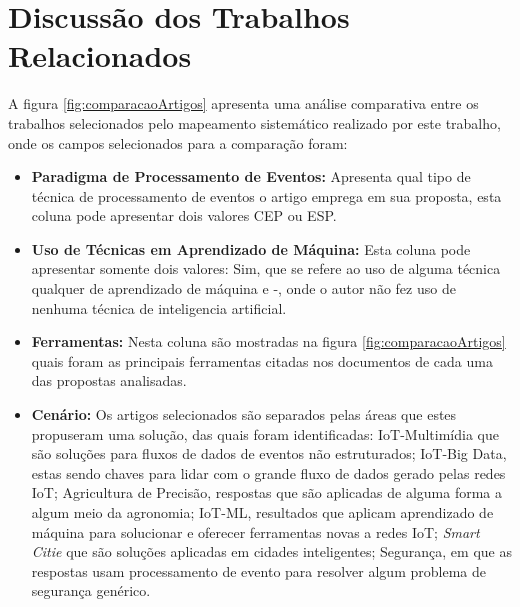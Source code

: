 \documentclass[ti,table]{texufpel} %
\begin{document}
  

  

\section{Discussão dos Trabalhos Relacionados} 

A figura \ref{fig:comparacaoArtigos} apresenta uma análise comparativa entre os trabalhos selecionados pelo mapeamento sistemático realizado por este trabalho, onde os campos selecionados para a comparação foram:  

  

\begin{itemize} 

     

    \item \textbf{Paradigma de Processamento de Eventos:} Apresenta qual tipo de técnica de processamento de eventos o artigo emprega em sua proposta, esta coluna pode apresentar dois valores CEP ou ESP.  

         

     

    \item \textbf{Uso de Técnicas em Aprendizado de Máquina:} Esta coluna pode apresentar somente dois valores: Sim, que se refere ao uso de alguma técnica qualquer de aprendizado de máquina e -, onde o autor não fez uso de nenhuma técnica de inteligencia artificial.  

     

    \item \textbf{Ferramentas:} Nesta coluna são mostradas na figura \ref{fig:comparacaoArtigos} quais foram as principais ferramentas citadas nos documentos de cada uma das propostas analisadas. 

     

    \item \textbf{Cenário:} Os artigos selecionados são separados pelas áreas que estes propuseram uma solução, das quais foram identificadas: IoT-Multimídia que são soluções para fluxos de dados de eventos não estruturados; IoT-Big Data, estas sendo chaves para lidar com o grande fluxo de dados gerado pelas redes IoT; Agricultura de Precisão, respostas que são aplicadas de alguma forma a algum meio da agronomia; IoT-ML, resultados que aplicam aprendizado de máquina para solucionar e oferecer ferramentas novas a redes IoT; \textit{Smart Citie} que são soluções aplicadas em cidades inteligentes; Segurança, em que as respostas usam processamento de evento para resolver algum problema de segurança genérico.  


\end{itemize}
\end{document}
